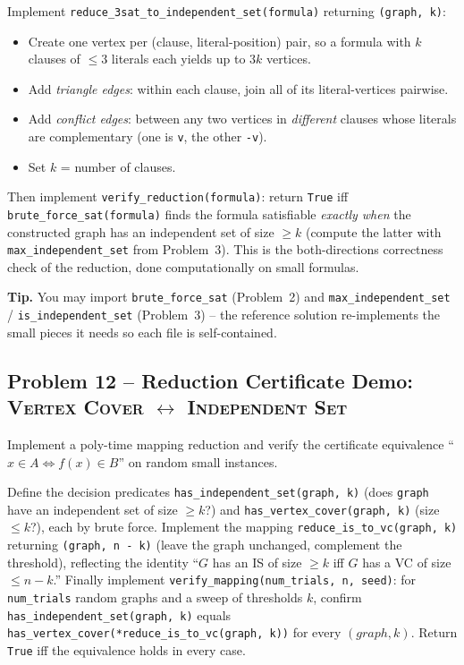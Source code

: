 \documentclass[11pt]{article}
\begin{document}
Implement \texttt{reduce\_3sat\_to\_independent\_set(formula)} returning \texttt{(graph, k)}:
\begin{itemize}
    \item Create one vertex per (clause, literal-position) pair, so a formula with $k$
    clauses of $\le 3$ literals each yields up to $3k$ vertices.
    \item Add \emph{triangle edges}: within each clause, join all of its literal-vertices
    pairwise.
    \item Add \emph{conflict edges}: between any two vertices in \emph{different} clauses
    whose literals are complementary (one is \texttt{v}, the other \texttt{-v}).
    \item Set $k$ = number of clauses.
\end{itemize}
Then implement \texttt{verify\_reduction(formula)}: return \texttt{True} iff
\texttt{brute\_force\_sat(formula)} finds the formula satisfiable \emph{exactly when} the
constructed graph has an independent set of size $\ge k$ (compute the latter with
\texttt{max\_independent\_set} from Problem~3). This is the both-directions correctness
check of the reduction, done computationally on small formulas.

\textbf{Tip.} You may import \texttt{brute\_force\_sat} (Problem~2) and
\texttt{max\_independent\_set} / \texttt{is\_independent\_set} (Problem~3) -- the reference
solution re-implements the small pieces it needs so each file is self-contained.

\subsection*{Problem 12 -- Reduction Certificate Demo: \textsc{Vertex Cover} \texorpdfstring{$\leftrightarrow$}{<->} \textsc{Independent Set}}

Implement a poly-time mapping reduction and verify the certificate equivalence ``$x \in A
\iff f(x) \in B$'' on random small instances.

Define the decision predicates \texttt{has\_independent\_set(graph, k)} (does \texttt{graph}
have an independent set of size $\ge k$?) and \texttt{has\_vertex\_cover(graph, k)} (size
$\le k$?), each by brute force. Implement the mapping
\texttt{reduce\_is\_to\_vc(graph, k)} returning \texttt{(graph, n - k)} (leave the graph
unchanged, complement the threshold), reflecting the identity ``$G$ has an IS of size $\ge
k$ iff $G$ has a VC of size $\le n - k$.'' Finally implement
\texttt{verify\_mapping(num\_trials, n, seed)}: for \texttt{num\_trials} random graphs and
a sweep of thresholds $k$, confirm \texttt{has\_independent\_set(graph, k)} equals
\texttt{has\_vertex\_cover(*reduce\_is\_to\_vc(graph, k))} for every $(graph, k)$. Return
\texttt{True} iff the equivalence holds in every case.
\end{document}
